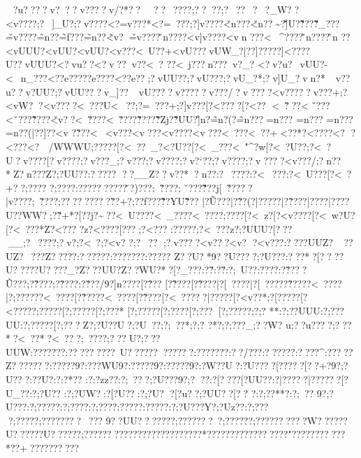 {{{{{{{{{{{{{{{{{{{{{{{{{{{{{{{{{{{{{{{{{{{{{{{{{{{{{{{{{{{{{{{{{{{{{{{{{{{{{{{{{{{{{{{{{{{{{{{{{{{{{{{{{{{{{{{{{{{{{{{{{{{{{{{{{{{{{{{{{{{{{{{{{{{{{{{{{{{{{{{{{{{{{{{{{{{{{{{{{{{{{{{{{{{{{{{{{{{{{{{{{{{{{{~?u????v???v? ???v/?*??~??~????;????;?~ ??~?~?_W??<v????;?~]_U?;?v????<?=v???*<?=~??? ;?]v????\v<n??? \v<n?? \~\vuUU?\~\v]U}?\~\v????\~\v_???\v=v????\~=n??\~=f??? \~=n??\~<v?{\v=v????\vn????<v]v????<vn ???<~^????\~n????\~n
 ??\?<vUUU?\?<vUU? \?<vUU? \?<v??? \?<~U??+\?<vU???\?vUW_?|??]?????]<????U??vUUU?<?vu??<?v??\?v??\?<~?
??\?<~j???\?n???\?v?_?
<?v?u?\<~vUU?-<~n_???<??e????\??e????<??e?? ;?vUU??;?vU???;?vU_?*;?v]U_?vn?*  ~v??u??v?UU?;?vUU???v_]??~vU????v?????v???/?v????<v?????v???+;?<vW? ?<v????<~???U<~??   ;?=~???+;?]v??? [?<????[?<??
<~\v???<~\v???<~\v}???\~\v????\v<v ??<~\v????<~\v????\v\~????\v\~?Zj?\v\~?UU?\~]n?  \~=n?(?\~=n???\?=n???
\?=n??? \?=n??? \?=n??( |??]??  \?<v
?  \?\~?? ?\?<~\? \?<v??? \?<v???\?<v????\?<v???\?<~???\?<~??+\?<??* ?\?<??? ?\?<?  ?\?<? ? ?\?<?

/\?\?WWWU\?;?????[?<~??~_{?<?U??[?<~_???\?<~"^?w[?<~?U??;?<~?U?\?v????[?v????;?v???_;?v ???;?v????;?v?`??;?v????;?v????<v???/;?n??*Z?n??? Z?;?UU??:????? ??__Z??v??*?n??  :?~????:?<~???:?<~U???[?<~?+?{?;????
{?;????:?\???? {??????\v?)???;~\v????;~\v???\v\~???j[~\v?????|v????;~\v????;?\n????\vW????\v??+?;??f??? \v\~??YU\~\v??? |?\~U???|?\~??(?|?\?????|?\~????|?\????|?\????U??\?WW?;?\~?+*?[?\??j?{\?\~^^??{?<~U???{?<~_???{?<~????\?;????[?<~z?[?<v????[?<~w?U?[?<~???*Z?<???
?z?<????[?\??? ;?<???  :?\?????;?<~??? z?;?UUU?[???__;?~????;?v?   ;?<~?  ;?<v?  ?;?~??
;?v??? ?<v??  ?<v?
  ?<v??? :????UUZ?~
??UZ?~ ???Z?? ???:??????:???????:??}???
Z??U?*9??U????;?U???:???*?[????U{?????U{????_?Z???UU?Z??WU?*?[?_???:?\v?   :?\v?   :?;~U? ?:?\n??? :?\v??? ?\~U???;?\~????;?\~????:?\v???/9?]n????[?\~??? [?\~????[?\~????|?[~????|?[~????{?\~????{?<~????|?;?????{?<~????[?\~????{?<~????[?\~????[?<~?????|?????[?<v??* ;?[?????[?<?????;?\?????[?;?????[?;???*
[?;?????[?;??? ?[?;???[?;?????;?;?
* *:?;??UUU:?;???UU:?;?????[?;???Z?;?U??U?;?U~??;?;~?? *;?;?
?*?;?;???_;??W?
u;??u????;???*?<~??* ?<~??  ?;~????;???U?;???UUW:???????:?????????~U???? ????????:???????:??/???:??????:?? ??^:??? ??Z???????:?????9?:???WU9?:?????9?:?????9?:?W??U?:?U????[?????[??+?9?;?U???:??}U?:?:?*??
:?:?zz??:?;~??  ?;?U???9?;???:?[?? ??[?UU??:?|??? ??|??????[?U_??:?;?U??
:?;?UW?:?[?U??:?;?U?
 ?[?u??;?UU??[??
?:?;??**?:?;~? ?
9?;?U???:?;?????:?;????:?;?}???:?\?????:?\?????:?;?U???Y?;?Uz??:?;???
 ?;?????;????????~???
9??UU???????;???????}~?   ;??????;??????????W??????U??????U???} ???;?????????????????????????*?????????????????"???????????*??+??????????
}}}}}}}}}}}}}}}}}}}}}}}}}}}}}}}}}}}}}}}}}}}}}}}}}}}}}}}}}}}}}}}}}}}}}}}}}}}}}}}}}}}}}}}}}}}}}}}}}}}}}}}}}}}}}}}}}}}}}}}}}}}}}}}}}}}}}}}}}}}}}}}}}}}}}}}}}}}}}}}}}}}}}}}}}}}}}}}}}}}}}}}}}}}}}}}}}}}}}}}}}}}}}}}}}}}}}}
